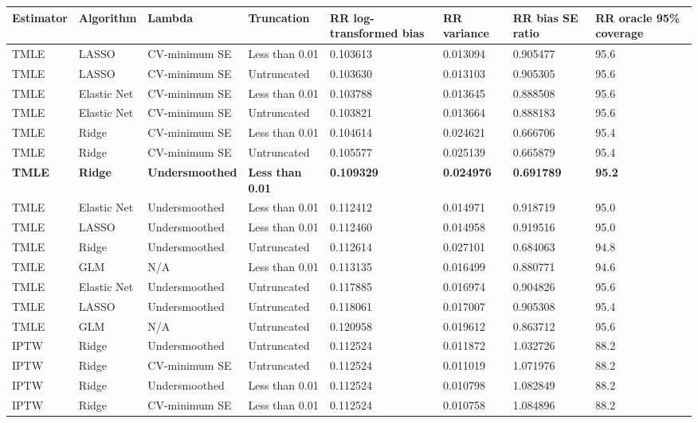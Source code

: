 
\begin{longtable}[l]{llllllll}
\toprule
Estimator & Algorithm & Lambda & Truncation & RR log-transformed bias & RR variance & RR bias SE ratio & RR oracle 95\% coverage\\
\midrule
TMLE & LASSO & CV-minimum SE & Less than 0.01 & 0.103613 & 0.013094 & 0.905477 & 95.6\\
TMLE & LASSO & CV-minimum SE & Untruncated & 0.103630 & 0.013103 & 0.905305 & 95.6\\
TMLE & Elastic Net & CV-minimum SE & Less than 0.01 & 0.103788 & 0.013645 & 0.888508 & 95.6\\
TMLE & Elastic Net & CV-minimum SE & Untruncated & 0.103821 & 0.013664 & 0.888183 & 95.6\\
TMLE & Ridge & CV-minimum SE & Less than 0.01 & 0.104614 & 0.024621 & 0.666706 & 95.4\\
TMLE & Ridge & CV-minimum SE & Untruncated & 0.105577 & 0.025139 & 0.665879 & 95.4\\
\midrule
\textbf{TMLE} & \textbf{Ridge} & \textbf{Undersmoothed} & \textbf{Less than 0.01} & \textbf{0.109329} & \textbf{0.024976} & \textbf{0.691789} & \textbf{95.2}\\
\midrule
TMLE & Elastic Net & Undersmoothed & Less than 0.01 & 0.112412 & 0.014971 & 0.918719 & 95.0\\
TMLE & LASSO & Undersmoothed & Less than 0.01 & 0.112460 & 0.014958 & 0.919516 & 95.0\\
TMLE & Ridge & Undersmoothed & Untruncated & 0.112614 & 0.027101 & 0.684063 & 94.8\\
TMLE & GLM & N/A & Less than 0.01 & 0.113135 & 0.016499 & 0.880771 & 94.6\\
TMLE & Elastic Net & Undersmoothed & Untruncated & 0.117885 & 0.016974 & 0.904826 & 95.6\\
TMLE & LASSO & Undersmoothed & Untruncated & 0.118061 & 0.017007 & 0.905308 & 95.4\\
TMLE & GLM & N/A & Untruncated & 0.120958 & 0.019612 & 0.863712 & 95.6\\
IPTW & Ridge & Undersmoothed & Untruncated & 0.112524 & 0.011872 & 1.032726 & 88.2\\
IPTW & Ridge & CV-minimum SE & Untruncated & 0.112524 & 0.011019 & 1.071976 & 88.2\\
IPTW & Ridge & Undersmoothed & Less than 0.01 & 0.112524 & 0.010798 & 1.082849 & 88.2\\
IPTW & Ridge & CV-minimum SE & Less than 0.01 & 0.112524 & 0.010758 & 1.084896 & 88.2\\

\end{longtable}
